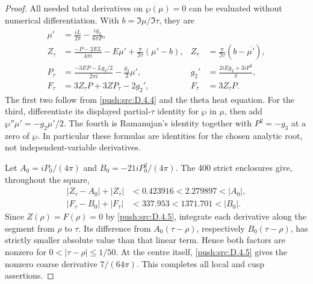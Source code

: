 \begin{proof}
All needed total derivatives on $\wp(\mu)=0$ can be evaluated
without numerical differentiation. With $b=\Im\mu/\Im\tau$,
they are
\[
\begin{aligned}
 \mu'&=\frac{iL}{2\pi}-\frac{i g_2}{6\pi P},\\
 Z_\tau&=\frac{-P-2EL}{4\pi i}-E\mu'
                  +\frac\pi{\Im\tau}(\mu'-b),&
 Z_{\bar\tau}&=\frac\pi{\Im\tau}(b-\overline{\mu'}),\\
 P_\tau&=\frac{-3EP-Lg_2/2}{2\pi i}-\frac{g_2}2\mu',&
 g_2'&=\frac{2iEg_2+3iP^2}{\pi},\\
 F_\tau&=3Z_\tau P+3ZP_\tau-2g_2',&
 F_{\bar\tau}&=3Z_{\bar\tau}P.
\end{aligned}
\]
The first two follow from \ref{push:src:D.4.4} and the theta heat equation. For the
third, differentiate its displayed partial-$\tau$ identity for
$\wp$ in $\mu$, then add $\wp''\mu'=-g_2\mu'/2$.
The fourth is Ramanujan's identity together with $P^2=-g_3$ at a
zero of $\wp$. In particular these formulas are identities for
the chosen analytic root, not independent-variable derivatives.

Let $A_0=iP_0/(4\pi)$ and $B_0=-21iP_0^2/(4\pi)$. The
400 strict enclosures give, throughout the square,
\[
\begin{aligned}
 |Z_\tau-A_0|+|Z_{\bar\tau}|&<0.423916
                         <2.279897<|A_0|,\\
 |F_\tau-B_0|+|F_{\bar\tau}|&<337.953
                         <1371.701<|B_0|.
\end{aligned}
\]
Since $Z(\rho)=F(\rho)=0$ by \ref{push:src:D.4.5}, integrate each derivative
along the segment from $\rho$ to $\tau$. Its difference from
$A_0(\tau-\rho)$, respectively $B_0(\tau-\rho)$, has strictly
smaller absolute value than that linear term. Hence both factors
are nonzero for $0<|\tau-\rho|\leq1/50$. At the centre itself,
\ref{push:src:D.4.5} gives the nonzero coarse derivative $7/(64\pi)$.
This completes all local and cusp assertions.
\end{proof}



